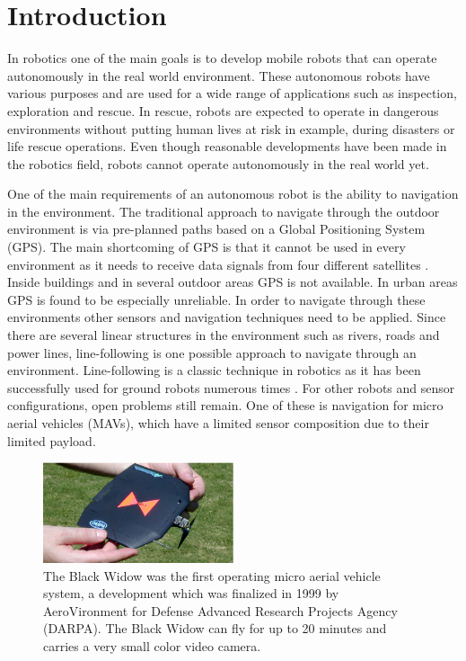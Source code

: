 \documentclass[a4paper]{article}
\begin{document}
\tableofcontents
\newpage
\setcounter{page}{1}
\onehalfspace

\section{Introduction}
In robotics one of the main goals is to develop mobile robots that can operate autonomously in the real world environment. These autonomous robots have various purposes and are used for a wide range of applications such as inspection, exploration and rescue. In rescue, robots are expected to operate in dangerous environments without putting human lives at risk in example, during disasters or life rescue operations. Even though reasonable developments have been made in the robotics field, robots cannot operate autonomously in the real world yet.

One of the main requirements of an autonomous robot is the ability to navigation in the environment. The traditional approach to navigate through the outdoor environment is via pre-planned paths based on a Global Positioning System (GPS). The main shortcoming of GPS is that it cannot be used in every environment as it needs to receive data signals from four different satellites \cite{Bajaj2002}. Inside buildings and in several outdoor areas GPS is not available. In urban areas GPS is found to be especially unreliable. In order to navigate through these environments other sensors and navigation techniques need to be applied. Since there are several linear structures in the environment such as rivers, roads and power lines, line-following is one possible approach to navigate through an environment. Line-following is a classic technique in robotics as it has been successfully used for ground robots numerous times \cite{Sampei1995, Dupuis2006}. For other robots and sensor configurations, open problems still remain. One of these is navigation for micro aerial vehicles (MAVs), which have a limited sensor composition due to their limited payload.

\begin{figure}[!h]
	\centering
	\includegraphics[width=0.5\textwidth]{images/blackwidow.eps}
	\caption{The Black Widow \cite{Grasmeyer2001} was the first operating micro aerial vehicle system, a development which was finalized in 1999 by AeroVironment for Defense Advanced Research Projects Agency (DARPA). The Black Widow can fly for up to 20 minutes and carries a very small color video camera.}
	\label{blackwidow}
\end{figure}
\end{document}
